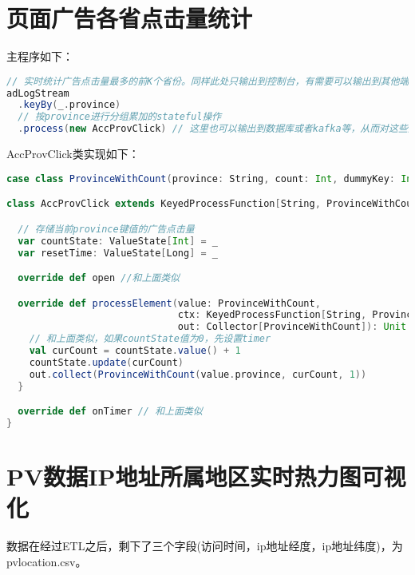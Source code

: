 \documentclass[oneside]{ctexbook}
\begin{document}
\section{页面广告各省点击量统计}

主程序如下：

\begin{lstlisting}[language=scala]
// 实时统计广告点击量最多的前K个省份。同样此处只输出到控制台，有需要可以输出到其他端口。
adLogStream
  .keyBy(_.province)
  // 按province进行分组累加的stateful操作
  .process(new AccProvClick) // 这里也可以输出到数据库或者kafka等，从而对这些聚合好的数据进行不同需求的分析
\end{lstlisting}

AccProvClick类实现如下：

\begin{lstlisting}[language=scala]
case class ProvinceWithCount(province: String, count: Int, dummyKey: Int)

class AccProvClick extends KeyedProcessFunction[String, ProvinceWithCount, ProvinceWithCount] {

  // 存储当前province键值的广告点击量
  var countState: ValueState[Int] = _
  var resetTime: ValueState[Long] = _

  override def open //和上面类似

  override def processElement(value: ProvinceWithCount,
                              ctx: KeyedProcessFunction[String, ProvinceWithCount, ProvinceWithCount]#Context,
                              out: Collector[ProvinceWithCount]): Unit = {
    // 和上面类似，如果countState值为0，先设置timer
    val curCount = countState.value() + 1
    countState.update(curCount)
    out.collect(ProvinceWithCount(value.province, curCount, 1))
  }

  override def onTimer // 和上面类似
}
\end{lstlisting}

\section{PV数据IP地址所属地区实时热力图可视化}

数据在经过ETL之后，剩下了三个字段(访问时间，ip地址经度，ip地址纬度)，为pvlocation.csv。
\end{document}
